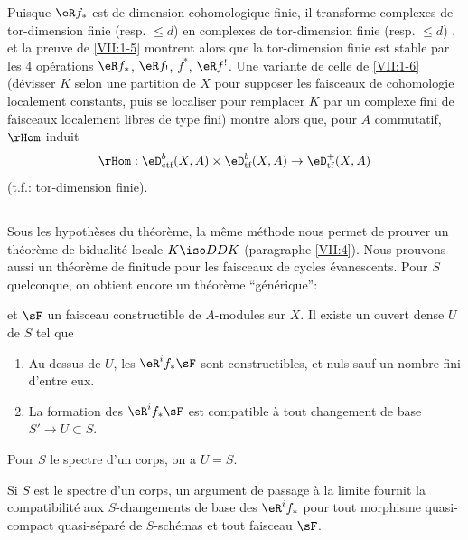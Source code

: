 Puisque $\eR f_\ast$ est de dimension cohomologique finie, il transforme 
complexes de tor-dimension finie (resp. $\leqslant d$) en complexes de 
tor-dimension finie (resp. $\leqslant d$) \cite[XVII 5.2.11]{sga4}. 
\cite[XVII 5.2.10]{sga4} et la preuve de \ref{VII:1-5} montrent alors que la 
tor-dimension finie est stable par les $4$ opérations $\eR f_\ast$, 
$\eR f_!$, $f^\ast$, $\eR f^!$. Une variante de celle de \ref{VII:1-6} 
(dévisser $K$ selon une partition de $X$ pour supposer les faisceaux de 
cohomologie localement constants, puis se localiser pour remplacer $K$ par un 
complexe fini de faisceaux localement libres de type fini) montre alors que, 
pour $A$ commutatif, $\rHom$ induit 
\[
  \rHom:\eD_\text{ctf}^b(X,A)\times \eD_\text{tf}^b(X,A) \to \eD_\text{tf}^+(X,A) 
\]
(t.f.: tor-dimension finie). 





\subsection{}\label{VII:1-8}

Sous les hypothèses du théorème, la même méthode nous permet de 
prouver un théorème de bidualité locale $K\iso D D K$ (paragraphe 
\ref{VII:4}). Nous prouvons aussi un théorème de finitude pour les 
faisceaux de cycles évanescents. Pour $S$ quelconque, on obtient encore un 
théorème ``générique'': 





\begin{theorem_}\label{VII:1-9}
 et $\sF$ un faisceau 
constructible de $A$-modules sur $X$. Il existe un ouvert dense $U$ de $S$ tel 
que 
\begin{enumerate}[\indent (i)]
  \item Au-dessus de $U$, les $\eR^i f_\ast \sF$ sont constructibles, et nuls 
    sauf un nombre fini d'entre eux. 
  \item La formation des $\eR^i f_\ast \sF$ est compatible à tout 
    changement de base $S' \to U\subset S$. 
\end{enumerate}
\end{theorem_}

Pour $S$ le spectre d'un corps, on a $U=S$. 

Si $S$ est le spectre d'un corps, un argument de passage à la limite fournit 
la compatibilité aux $S$-changements de base des $\eR^i f_\ast$ pour tout 
morphisme quasi-compact quasi-séparé de $S$-schémas et tout faisceau 
$\sF$. 





